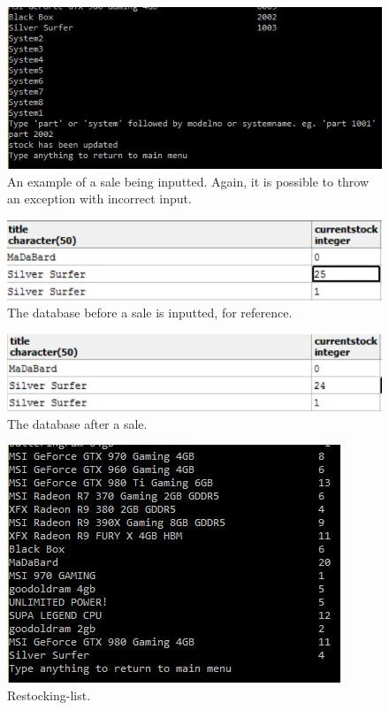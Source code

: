 \documentclass[a4paper,10pt]{article}
\begin{document}
\begin{figure}[H]\center
	\includegraphics[scale=1]{Saletest5.jpg}
	\caption{An example of a sale being inputted. Again, it is possible to throw an exception with incorrect input.}
\end{figure}

\begin{figure}[H]\center
	\includegraphics[scale=1]{10021.jpg}
	\caption{The database before a sale is inputted, for reference.}
\end{figure}
\begin{figure}[H]\center
	\includegraphics[scale=1]{10022.jpg}
	\caption{The database after a sale.}
\end{figure}

\begin{figure}[H]\center
	\includegraphics[scale=1]{test6restock.jpg}
	\caption{Restocking-list.}
\end{figure}
\end{document}
